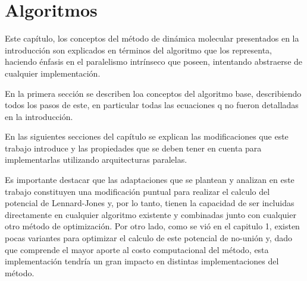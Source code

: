 
\chapter{Algoritmos}



Este capítulo, los conceptos del m\'etodo de dinámica molecular presentados en la introducción son explicados en términos del algoritmo que los representa, haciendo énfasis en el paralelismo intrínseco que poseen, intentando abstraerse de cualquier implementación.

En la primera sección se describen loa conceptos del algoritmo base, describiendo todos los pasos de este, en particular todas las ecuaciones q no fueron detalladas en la introducción. 

En las siguientes secciones del capítulo se explican las modificaciones que este trabajo introduce y las propiedades que se deben tener en cuenta para implementarlas utilizando arquitecturas paralelas.

Es importante destacar que las adaptaciones que se plantean y analizan en este trabajo constituyen una modificación puntual para realizar el calculo del potencial de Lennard-Jones y, por lo tanto, tienen la capacidad de ser incluidas directamente en cualquier algoritmo existente y combinadas junto con cualquier otro método de optimización.
Por otro lado, como se vió en el capitulo 1, existen pocas variantes para optimizar el calculo de este potencial de no-unión y, dado que comprende el mayor aporte al costo computacional del método, esta implementación tendría un gran impacto en distintas implementaciones del método.










